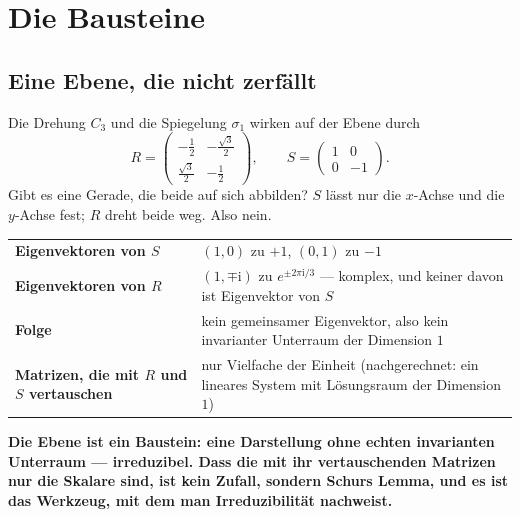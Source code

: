 \chapter{Die Bausteine}

\section{Eine Ebene, die nicht zerfällt}

\begin{merksatz}
Die Drehung $C_3$ und die Spiegelung $\sigma_1$ wirken auf der Ebene durch
\[ R = \begin{pmatrix}-\tfrac12 & -\tfrac{\sqrt3}{2}\\ \tfrac{\sqrt3}{2} & -\tfrac12\end{pmatrix}, \qquad S = \begin{pmatrix}1 & 0\\ 0 & -1\end{pmatrix} . \]
Gibt es eine Gerade, die beide auf sich abbilden? $S$ lässt nur die $x$-Achse und die $y$-Achse fest; $R$ dreht beide weg. Also nein.

\begin{center}
{\small
\renewcommand{\arraystretch}{1.5}
\begin{tabular}{@{}P{3.4cm}P{5.2cm}@{}}
\toprule
\textbf{Eigenvektoren von $S$} & $(1, 0)$ zu $+1$, $(0, 1)$ zu $-1$\\
\textbf{Eigenvektoren von $R$} & $(1, \mp\mathrm i)$ zu $e^{\pm2\pi\mathrm i/3}$ --- komplex, und keiner davon ist Eigenvektor von $S$\\
\textbf{Folge} & kein gemeinsamer Eigenvektor, also kein invarianter Unterraum der Dimension $1$\\
\textbf{Matrizen, die mit $R$ und $S$ vertauschen} & nur Vielfache der Einheit (nachgerechnet: ein lineares System mit Lösungsraum der Dimension $1$)\\
\bottomrule
\end{tabular}}
\end{center}

\begin{center}
\begin{minipage}{0.9\textwidth}
\textbf{Die Ebene ist ein Baustein: eine Darstellung ohne echten invarianten Unterraum --- irreduzibel. Dass die mit ihr vertauschenden Matrizen nur die Skalare sind, ist kein Zufall, sondern Schurs Lemma, und es ist das Werkzeug, mit dem man Irreduzibilität nachweist.}
\end{minipage}
\end{center}


\end{merksatz}
